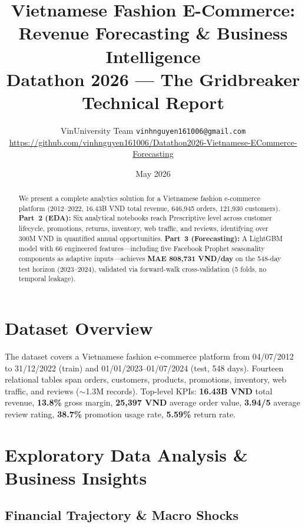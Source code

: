 \documentclass{article}
\title{\textbf{Vietnamese Fashion E-Commerce:\\Revenue Forecasting \& Business Intelligence}\\
\large Datathon 2026 — The Gridbreaker Technical Report}
\author{VinUniversity Team \quad \texttt{vinhnguyen161006@gmail.com}\\[3pt]
\small \url{https://github.com/vinhnguyen161006/Datathon2026-Vietnamese-ECommerce-Forecasting}}
\date{May 2026}
\begin{document}
\maketitle

\begin{abstract}
We present a complete analytics solution for a Vietnamese fashion e-commerce platform (2012--2022, 16.43B VND total revenue, 646,945 orders, 121,930 customers). \textbf{Part~2 (EDA):} Six analytical notebooks reach Prescriptive level across customer lifecycle, promotions, returns, inventory, web traffic, and reviews, identifying over 300M VND in quantified annual opportunities. \textbf{Part~3 (Forecasting):} A LightGBM model with 66 engineered features---including five Facebook Prophet seasonality components as adaptive inputs---achieves \textbf{MAE 808,731 VND/day} on the 548-day test horizon (2023--2024), validated via forward-walk cross-validation (5 folds, no temporal leakage).
\end{abstract}


\section{Dataset Overview}

The dataset covers a Vietnamese fashion e-commerce platform from 04/07/2012 to 31/12/2022 (train) and 01/01/2023--01/07/2024 (test, 548 days). Fourteen relational tables span orders, customers, products, promotions, inventory, web traffic, and reviews ($\sim$1.3M records). Top-level KPIs: \textbf{16.43B VND} total revenue, \textbf{13.8\%} gross margin, \textbf{25,397 VND} average order value, \textbf{3.94/5} average review rating, \textbf{38.7\%} promotion usage rate, \textbf{5.59\%} return rate.

\section{Exploratory Data Analysis \& Business Insights}

\subsection{Financial Trajectory \& Macro Shocks}
\end{document}

